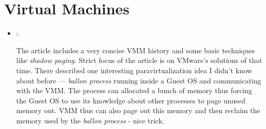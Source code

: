 \section*{Virtual Machines}
\begin{itemize}
    \item \cite{Rosenblum:VMM-trends:2005}:

    The article includes a very concise VMM history and some basic techniques like \textit{shadow paging}. Strict focus of the article is on VMware's solutions of that time. There described one interesting paravirtualization idea I didn't know about before --- \textit{ballon process} running inside a Guest OS and communicating with the VMM. The process can allocated a bunch of memory thus forcing the Guest OS to use its knowledge about other processes to page unused memory out. VMM thus can also page out this memory and then reclaim the memory used by the \textit{ballon process} - nice trick.
\end{itemize}

